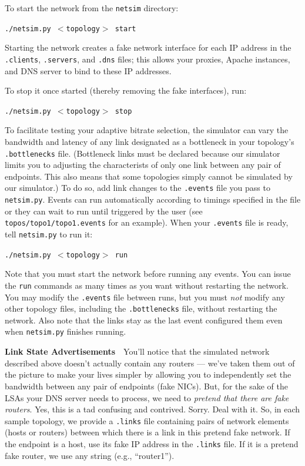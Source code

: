 \documentclass{article}
\begin{document}
To start the network from the \texttt{netsim} directory:
\begin{center}
	\texttt{./netsim.py $<$topology$>$ start}
\end{center}
Starting the network creates a fake network interface for each IP address in
the \texttt{.clients}, \texttt{.servers}, and \texttt{.dns} files; this allows
your proxies, Apache instances, and DNS server to bind to these IP addresses.

To stop it once started (thereby removing the fake interfaces), run:
\begin{center}
	\texttt{./netsim.py $<$topology$>$ stop}
\end{center}

To facilitate testing your adaptive bitrate selection, the simulator can vary
the bandwidth and latency of any link designated as a bottleneck in your
topology's \texttt{.bottlenecks} file. (Bottleneck links must be declared
because our simulator limits you to adjusting the characterists of only one
link between any pair of endpoints. This also means that some topologies simply
cannot be simulated by our simulator.) To do so, add link changes to the
\texttt{.events} file you pass to \texttt{netsim.py}. Events can run
automatically according to timings specified in the file or they can wait to
run until triggered by the user (see \texttt{topos/topo1/topo1.events} for an
example). When your \texttt{.events} file is ready, tell \texttt{netsim.py} to
run it:
\begin{center}
	\texttt{./netsim.py $<$topology$>$ run}
\end{center}
Note that you must start the network before running any events. You can issue
the \texttt{run} commands as many times as you want without restarting the
network. You may modify the \texttt{.events} file between runs, but you must
\emph{not} modify any other topology files, including the \texttt{.bottlenecks}
file, without restarting the network. Also note that the links stay as the last
event configured them even when \texttt{netsim.py} finishes running.

\medskip \noindent \textbf{Link State Advertisements}~~You'll notice that the
simulated network described above doesn't actually contain any routers ---
we've taken them out of the picture to make your lives simpler by allowing you
to independently set the bandwidth between any pair of endpoints (fake NICs).
But, for the sake of the LSAs your DNS server needs to process, we need to
\emph{pretend that there are fake routers}. Yes, this is a tad confusing and
contrived. Sorry. Deal with it. So, in each sample topology, we provide a
\texttt{.links} file containing pairs of network elements (hosts or routers)
between which there is a link in this pretend fake network. If the endpoint is
a host, use its fake IP address in the \texttt{.links} file. If it is a pretend
fake router, we use any string (e.g., ``router1'').
\end{document}
